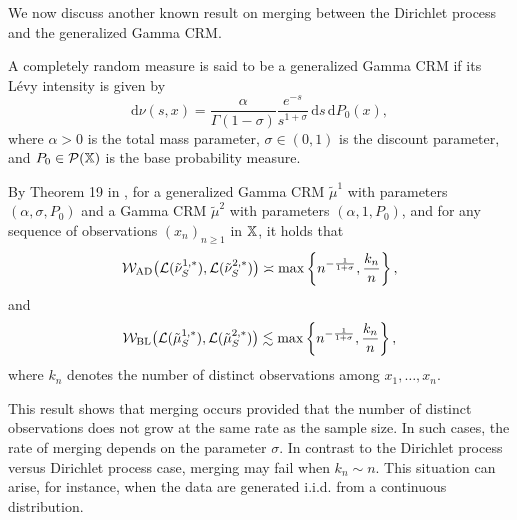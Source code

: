 We now discuss another known result on merging between the Dirichlet process and the generalized Gamma CRM.
\begin{definition}
\label{definition:generalized_gamma_crm}
A completely random measure is said to be a generalized Gamma CRM if its L\'evy intensity is given by
\[
\mathrm{d}\nu(s,x) = \frac{\alpha}{\Gamma(1-\sigma)}\frac{e^{-s}}{s^{1+\sigma}}\,\mathrm{d}s \,\mathrm{d}P_0(x),
\]
where $\alpha > 0$ is the total mass parameter, $\sigma \in (0,1)$ is the discount parameter, and $P_0 \in \mathcal{P}(\mathbb{X})$ is the base probability measure.
\end{definition}

By Theorem 19 in \cite{catalano2026merging}, for a generalized Gamma CRM $\tilde{\mu}^1$ with parameters $(\alpha, \sigma, P_0)$ and a Gamma CRM $\tilde{\mu}^2$ with parameters $(\alpha, 1, P_0)$, and for any sequence of observations $(x_n)_{n \geq 1}$ in $\mathbb{X}$, it holds that
\[
\mathcal{W}_{\mathrm{AD}}\big(\mathcal{L}(\tilde{\nu}_S^{1,*}), \mathcal{L}(\tilde{\nu}_S^{2,*})\big) \asymp \max\left\{n^{-\frac{1}{1+\sigma}}, \frac{k_n}{n}\right\},
\]
and
\[
\mathcal{W}_{\mathrm{BL}}\bigl(\mathcal{L}(\tilde{\mu}_S^{1,*}), \mathcal{L}(\tilde{\mu}_S^{2,*})\bigr) \lesssim \max\left\{n^{-\frac{1}{1+\sigma}}, \frac{k_n}{n}\right\},
\]
where $k_n$ denotes the number of distinct observations among $x_1,\dots, x_n$.

This result shows that merging occurs provided that the number of distinct observations does not grow at the same rate as the sample size. In such cases, the rate of merging depends on the parameter $\sigma$. In contrast to the Dirichlet process versus Dirichlet process case, merging may fail when $k_n \sim n$. This situation can arise, for instance, when the data are generated i.i.d. from a continuous distribution.



